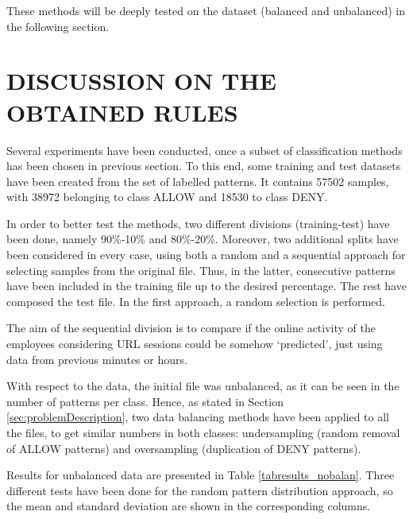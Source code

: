 \documentclass{llncs}
\begin{document}
These methods will be deeply tested on the dataset (balanced and unbalanced) in the following section.

%
\section{\uppercase{Discussion on the Obtained Rules}}
\label{sec:rulesdiscussion}

\noindent Several experiments have been conducted, once a subset of classification methods has been chosen in previous section.
To this end, some training and test datasets have been created from
the set of labelled patterns. It contains 57502 samples, with 38972
belonging to class ALLOW and 18530 to class DENY.

In order to better test the methods, two different divisions (training-test) have been done, namely 90\%-10\% and 80\%-20\%. Moreover, two additional splits have been considered in every case, using both a random and a sequential approach for selecting samples from the original file. Thus, in the latter, consecutive patterns have been included in the training file up to the desired percentage. The rest have composed the test file. In the first approach, a random selection is performed.

The aim of the sequential division is to compare if the online activity of the employees considering URL sessions could be somehow `predicted', just using data from previous minutes or hours.

With respect to the data, the initial file was unbalanced, as it can be seen in the number of patterns per class. Hence, as stated in Section \ref{sec:problemDescription}, two data balancing methods have been applied to all the files, to get similar numbers in both classes: undersampling (random removal of ALLOW patterns) and oversampling (duplication of DENY patterns).

Results for unbalanced data are presented in Table \ref{tabresults_nobalan}.
Three different tests have been done for the random pattern distribution approach, so the mean and standard deviation are shown in the corresponding columns.
\end{document}
